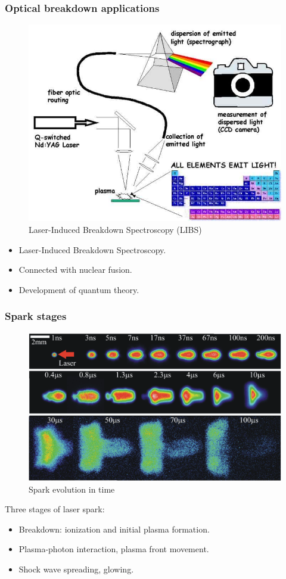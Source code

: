 \documentclass{beamer}
\begin{document}
	\begin{frame}
		\frametitle{Optical breakdown applications}
		
		\begin{figure}
			\centering
			\includegraphics[width=0.5\linewidth]{res/libs.jpg}
			\caption*{Laser-Induced Breakdown Spectroscopy (LIBS)}
		\end{figure}
		
		\begin{itemize}
			\item Laser-Induced Breakdown Spectroscopy.
			\item Connected with nuclear fusion.
			\item Development of quantum theory.
		\end{itemize}
		
	\end{frame}
	
	\begin{frame}
		\frametitle{Spark stages}
		\begin{figure}
			\centering
			\includegraphics[width=0.8\linewidth]{res/spark_evolution.png}
			\caption*{Spark evolution in time}
		\end{figure}
		\vspace{-5pt}
		Three stages of laser spark:
		\begin{itemize}
			\item Breakdown: ionization and initial plasma formation.
			\item Plasma-photon interaction, plasma front movement.
			\item Shock wave spreading, glowing.
		\end{itemize}
	\end{frame}
	
\end{document}
